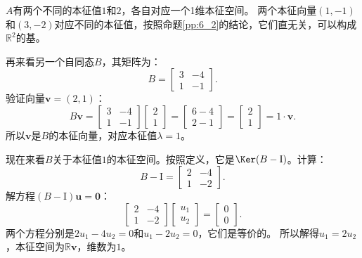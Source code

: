 \documentclass[12pt,UTF8,fontset=none]{ctexbook}
\begin{document}
$A$有两个不同的本征值$1$和$2$，各自对应一个1维本征空间。
两个本征向量$(1,-1)$和$(3,-2)$对应不同的本征值，按照命题\ref{pp:6_2}的结论，它们直无关，可以构成$\mathbb{R}^2$的基。

再来看另一个自同态$B$，其矩阵为：
$$
B = \begin{bmatrix} 3 & -4 \\ 1 & -1 \end{bmatrix}.
$$
验证向量$\mathbf{v}=(2,1)$：
$$
B\mathbf{v} =  \begin{bmatrix} 3 & -4 \\ 1 & -1 \end{bmatrix}\begin{bmatrix} 2 \\ 1 \end{bmatrix} = \begin{bmatrix} 6-4 \\ 2-1 \end{bmatrix} = \begin{bmatrix} 2 \\ 1 \end{bmatrix} = 1 \cdot \mathbf{v}.
$$
所以$\mathbf{v}$是$B$的本征向量，对应本征值$\lambda = 1$。

现在来看$B$关于本征值$1$的本征空间。按照定义，它是$\Ker(B - \mathrm{I})$。计算：
$$
B - \mathrm{I} = \begin{bmatrix} 2 & -4 \\ 1 & -2 \end{bmatrix}.
$$
解方程$(B - \mathrm{I})\mathbf{u} = \mathbf{0}$：
$$
\begin{bmatrix} 2 & -4 \\ 1 & -2 \end{bmatrix} \begin{bmatrix} u_1 \\ u_2 \end{bmatrix} = \begin{bmatrix} 0 \\ 0 \end{bmatrix}.
$$
两个方程分别是$2u_1 - 4u_2 = 0$和$u_1 - 2u_2 = 0$，它们是等价的。
所以解得$u_1 = 2u_2$，本征空间为$\mathbb{R}\mathbf{v}$，维数为$1$。
\end{document}
